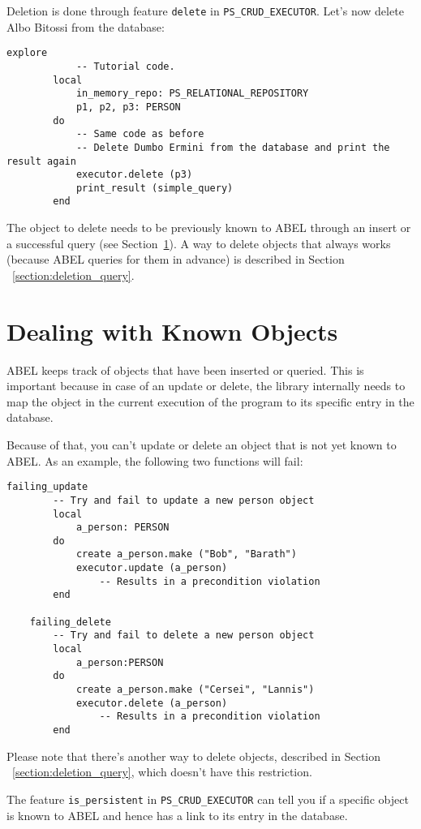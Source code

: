 \documentclass[a4paper,12pt]{report}
\begin{document}
Deletion is done through feature \lstinline{delete} in \lstinline{PS_CRUD_EXECUTOR}.
Let's now delete Albo Bitossi from the database:
\begin{lstlisting}[language=OOSC2Eiffel, captionpos=b, caption={Deleting an object.}, label={lst:tutorial_print_result}]
	explore
			-- Tutorial code.
		local
			in_memory_repo: PS_RELATIONAL_REPOSITORY
			p1, p2, p3: PERSON
		do
			-- Same code as before
			-- Delete Dumbo Ermini from the database and print the result again
			executor.delete (p3)
			print_result (simple_query)
		end
\end{lstlisting}
The object to delete needs to be previously known to ABEL through an insert or a successful query (see Section~\ref{section:dealing_with_known_objects}). A way to delete objects that always works (because ABEL  queries for them in advance) is described in Section ~\ref{section:deletion_query}.
\section{Dealing with Known Objects}
\label{section:dealing_with_known_objects}

ABEL keeps track of objects that have been inserted or queried.
This is important because in case of an update or delete, the library internally needs to map the object in the current execution of the program to its specific entry in the database.

Because of that, you can't update or delete an object that is not yet known to ABEL.
As an example, the following two functions will fail:

\begin{lstlisting}[language=OOSC2Eiffel, captionpos=b, caption={Failing updates and deletes.}, label={lst:failing_update_delete}]
	failing_update
		-- Try and fail to update a new person object
		local
			a_person: PERSON
		do
			create a_person.make ("Bob", "Barath")
			executor.update (a_person)
				-- Results in a precondition violation
		end

	failing_delete
		-- Try and fail to delete a new person object
		local
			a_person:PERSON
		do
			create a_person.make ("Cersei", "Lannis")
			executor.delete (a_person) 
				-- Results in a precondition violation
		end
\end{lstlisting}

Please note that there's another way to delete objects, described in Section ~\ref{section:deletion_query}, which doesn't have this restriction.

The feature \lstinline{is_persistent} in \lstinline!PS_CRUD_EXECUTOR! can tell you if a specific object is known to ABEL and hence has a link to its entry in the database.
\end{document}
